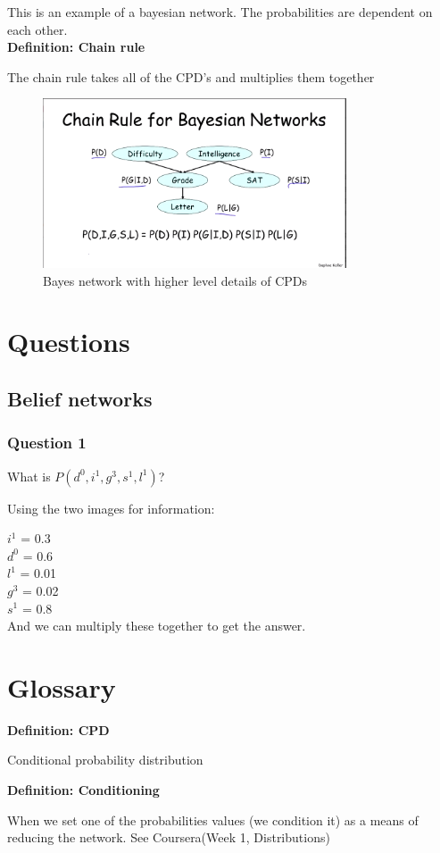 \documentclass[11pt]{report}
\newcommand{\define}[2] {
  \textbf{Definition: #1}
  \begin{center} #2
\end{center}
}
\begin{document}
This is an example of a bayesian network. The probabilities are dependent on each other. \\

\define{Chain rule}{The chain rule takes all of the CPD's and multiplies them together}

\begin{figure}[H]
\centering
\includegraphics[width=90mm]{images/cpd_chainrule.png}
\caption{Bayes network with higher level details of CPDs}
\label{sensorymockup2}
\end{figure}



\chapter{Questions}

\section{Belief networks}
\subsection{Question 1}
What is $P(d^0, i^1, g^3, s^1, l^1)$?

Using the two images for information:

$i^1$ = 0.3 \\
$d^0$ = 0.6 \\
$l^1$ = 0.01 \\
$g^3$ = 0.02 \\
$s^1$ = 0.8 \\

And we can multiply these together to get the answer. 


\chapter{Glossary}
\define{CPD}{Conditional probability distribution}
\define{Conditioning}{When we set one of the probabilities values (we condition it) as a means of reducing the network. See Coursera(Week 1, Distributions)}
\end{document}
